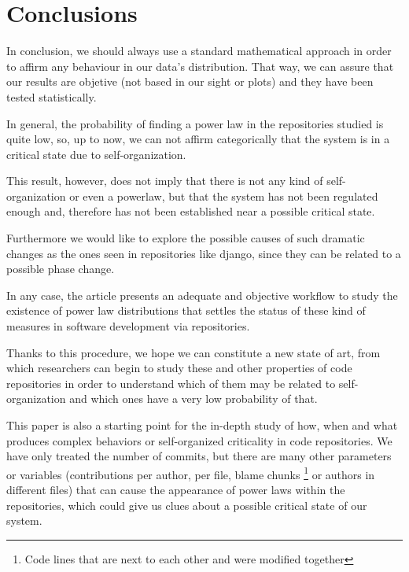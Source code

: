 \documentclass[conference]{IEEEtran}
\begin{document}


\section{Conclusions}\label{conc}



In conclusion, we should always use a standard mathematical approach in order to affirm any behaviour in our data's distribution. That way, we can assure that our results are objetive (not based in our sight or plots) and they have been tested statistically. %

In general, the probability of finding a power law  in the repositories studied is quite low, so, up to now, we can not affirm categorically that the system is in a critical state due to self-organization.

This result, however, does not imply that there is not any kind of self-organization or even a powerlaw, but that the system has not been regulated enough and, therefore has not been established near a possible critical state.



Furthermore we would like to explore the possible causes of such dramatic changes as the ones seen in repositories like django, since they can be related to a possible phase change.

In any case, the article presents an adequate and objective workflow to study the existence of power law distributions that settles the status of these kind of measures in software development via repositories.

Thanks to this procedure, we hope we can constitute a new state of art, from which researchers can begin to study these and other properties of code repositories in order to understand which of them may be related to self-organization and which ones have a very low probability of that.  

This paper is also a starting point for the in-depth study of how,
when and what produces complex behaviors or self-organized criticality in code repositories. We have only treated the number of commits, but there are many other parameters or variables (contributions per author, per file, blame chunks \footnote{Code lines that are next to each other and were modified together} or authors in different files)
that can cause the appearance of power laws within the repositories, which could give us clues about a possible critical state of our system.
\end{document}
